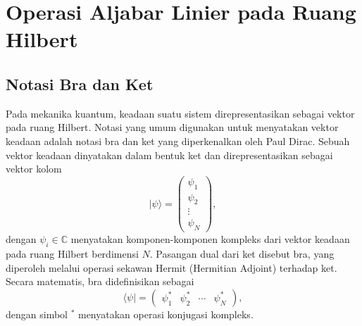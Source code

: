 \chapter{Operasi Aljabar Linier pada Ruang Hilbert}

\section{Notasi Bra dan Ket}
Pada mekanika kuantum, keadaan suatu sistem direpresentasikan sebagai vektor pada ruang Hilbert. Notasi yang umum digunakan untuk menyatakan vektor keadaan adalah notasi bra dan ket yang diperkenalkan oleh Paul Dirac. Sebuah vektor keadaan dinyatakan dalam bentuk ket dan direpresentasikan sebagai vektor kolom
\begin{equation}
    |\psi\rangle =
    \begin{pmatrix}
        \psi_1 \\
        \psi_2 \\
        \vdots \\
        \psi_N
    \end{pmatrix},
\end{equation}
dengan $\psi_i \in \mathbb{C}$ menyatakan komponen-komponen kompleks dari vektor keadaan pada ruang Hilbert berdimensi $N$. Pasangan dual dari ket disebut bra, yang diperoleh melalui operasi sekawan Hermit (Hermitian Adjoint) terhadap ket. Secara matematis, bra didefinisikan sebagai
\begin{equation}
    \langle \psi | =
    \begin{pmatrix}
        \psi_1^{*} &
        \psi_2^{*} &
        \cdots &
        \psi_N^{*}
    \end{pmatrix},
\end{equation}
dengan simbol $^*$ menyatakan operasi konjugasi kompleks.

